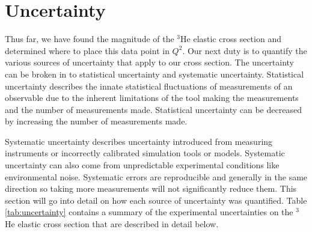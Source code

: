\section{Uncertainty}
\label{sec:uncertainty}

Thus far, we have found the magnitude of the $^3$He elastic cross section and determined where to place this data point in $Q^2$. Our next duty is to quantify the various sources of uncertainty that apply to our cross section. The uncertainty can be broken in to statistical uncertainty and systematic uncertainty. Statistical uncertainty describes the innate statistical fluctuations of measurements of an observable due to the inherent limitations of the tool making the measurements and the number of measurements made. Statistical uncertainty can be decreased by increasing the number of measurements made. 

Systematic uncertainty describes uncertainty introduced from measuring instruments or incorrectly calibrated simulation tools or models. Systematic uncertainty can also come from unpredictable experimental conditions like environmental noise. Systematic errors are reproducible and generally in the same direction so taking more measurements will not significantly reduce them. This section will go into detail on how each source of uncertainty was quantified. Table \ref{tab:uncertainty} contains a summary of the experimental uncertainties on the $^3$He elastic cross section that are described in detail below.

\vspace{5mm}

